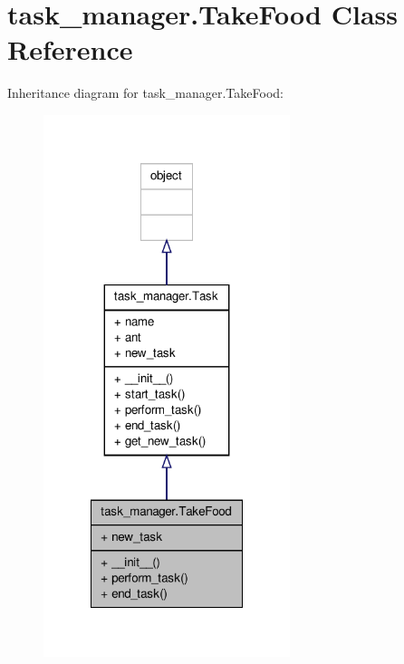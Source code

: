 \hypertarget{classtask__manager_1_1TakeFood}{\section{task\+\_\+manager.\+Take\+Food Class Reference}
\label{classtask__manager_1_1TakeFood}
}


Inheritance diagram for task\+\_\+manager.\+Take\+Food\+:\nopagebreak
\begin{figure}[H]
\begin{center}
\leavevmode
\includegraphics[width=204pt]{classtask__manager_1_1TakeFood__inherit__graph}
\end{center}
\end{figure}


